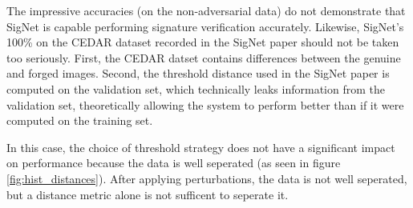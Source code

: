 The impressive accuracies (on the non-adversarial data) do not demonstrate that SigNet is capable performing signature verification accurately.
Likewise, SigNet's 100\% on the CEDAR dataset recorded in the SigNet paper should not be taken too seriously.
First, the CEDAR datset contains differences between the genuine and forged images.
Second, the threshold distance used in the SigNet paper is computed on the validation set, which technically leaks information from the validation set, theoretically allowing the system to perform better than if it were computed on the training set.

In this case, the choice of threshold strategy does not have a significant impact on performance because the data is well seperated (as seen in figure \ref{fig:hist_distances}).
After applying perturbations, the data is not well seperated, but a distance metric alone is not sufficent to seperate it.


